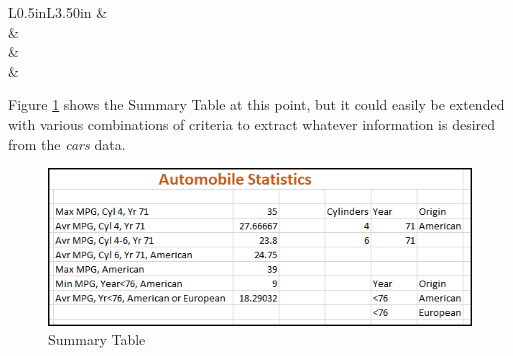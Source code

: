 \begin{enumbox}
\begin{enumerate}
\begin{table}[H]
{\begin{longtable}{L{0.5in}L{3.50in}}
					 & \\
					 & \\
					 & \\
					 & \\
					
				\end{longtable}
			} %
		\end{table}

	\end{enumerate}	
\end{enumbox}

Figure \ref{09:fig72} shows the Summary Table at this point, but it could easily be extended with various combinations of criteria to extract whatever information is desired from the \textit{cars} data. 

\begin{figure}[H]
	\centering
	\includegraphics[width=\maxwidth{.95\linewidth}]{gfx/ch09_fig72}
	\caption{Summary Table}
	\label{09:fig72}
\end{figure}

